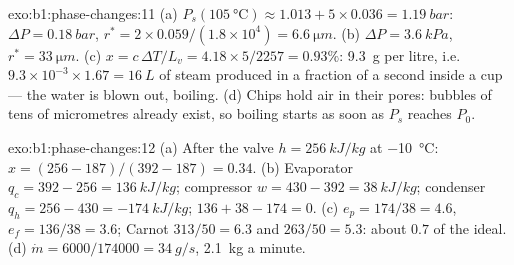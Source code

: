 \begin{solution}{exo:b1:phase-changes:11}
(a) $P_s(\qty{105}{\degreeCelsius}) \approx 1.013 + 5 \times 0.036 = \qty{1.19}{bar}$:
$\Delta P = \qty{0.18}{bar}$, $r^\ast = 2 \times 0.059/(1.8 \times 10^4) = \qty{6.6}{\micro m}$.
(b) $\Delta P = \qty{3.6}{kPa}$, $r^\ast = \qty{33}{\micro m}$. (c) $x = c\,\Delta T/L_v =
4.18 \times 5/2257 = 0.93\%$: \qty{9.3}{g} per litre, i.e.\ $9.3 \times 10^{-3}
\times 1.67 = \qty{16}{L}$ of steam produced in a fraction of a second inside
a cup --- the water is blown out, boiling. (d) Chips hold air in their
pores: bubbles of tens of micrometres already exist, so boiling starts
as soon as $P_s$ reaches $P_0$.
\end{solution}

\begin{solution}{exo:b1:phase-changes:12}
(a) After the valve $h = \qty{256}{kJ/kg}$ at \qty{-10}{\degreeCelsius}: $x =
(256 - 187)/(392 - 187) = 0.34$. (b) Evaporator $q_c = 392 - 256 =
\qty{136}{kJ/kg}$; compressor $w = 430 - 392 = \qty{38}{kJ/kg}$; condenser
$q_h = 256 - 430 = \qty{-174}{kJ/kg}$; $136 + 38 - 174 = 0$. (c) $e_p =
174/38 = 4.6$, $e_f = 136/38 = 3.6$; Carnot $313/50 = 6.3$ and $263/50 =
5.3$: about $0.7$ of the ideal. (d) $\dot m = 6000/174000 = \qty{34}{g/s}$,
\qty{2.1}{kg} a minute.
\end{solution}

